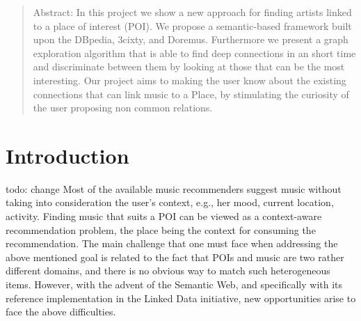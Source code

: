 \begin{titlepage}




 

\vfill %

\end{titlepage}
\tableofcontents
\newpage
\begin{abstract}
Abstract: In this project we show a new approach for finding artists linked to a place of interest (POI). We propose a semantic-based framework built upon the DBpedia, 3cixty, and Doremus. Furthermore we present a graph exploration algorithm that is able to find deep connections in an short time and discriminate between them by looking at those that can be the most interesting. Our project aims to making the user know about the existing connections that can link music to a Place, by stimulating the curiosity of the user proposing non common relations.
\end{abstract}

\section{Introduction}
todo: change
Most of the available music recommenders suggest music without taking into consideration the user’s context, e.g., her mood, current location, activity. 
Finding music that suits a POI can be viewed as a context-aware recommendation problem, the place being the context for consuming the recommendation.         
The main challenge that one must face when addressing the above mentioned goal is related to the fact that POIs and music are two rather different domains, and there is no obvious way to match such heterogeneous items. However, with the advent of the Semantic Web, and specifically with its reference implementation in the Linked Data initiative, new opportunities arise to face the above difficulties.  

